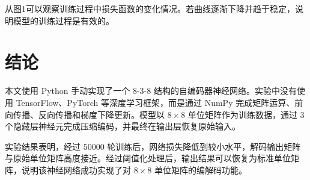 \documentclass[UTF8,a4paper,12pt]{ctexart}
\begin{document}
从图1可以观察训练过程中损失函数的变化情况。若曲线逐渐下降并趋于稳定，说明模型的训练过程是有效的。

\section{结论}

本文使用 Python 手动实现了一个 $8$-$3$-$8$ 结构的自编码器神经网络。实验中没有使用 TensorFlow、PyTorch 等深度学习框架，而是通过 NumPy 完成矩阵运算、前向传播、反向传播和梯度下降更新。模型以 $8 \times 8$ 单位矩阵作为训练数据，通过 $3$ 个隐藏层神经元完成压缩编码，并最终在输出层恢复原始输入。

实验结果表明，经过 $50000$ 轮训练后，网络损失降低到较小水平，解码输出矩阵与原始单位矩阵高度接近。经过阈值化处理后，输出结果可以恢复为标准单位矩阵，说明该神经网络成功实现了对 $8 \times 8$ 单位矩阵的编解码功能。
\end{document}
